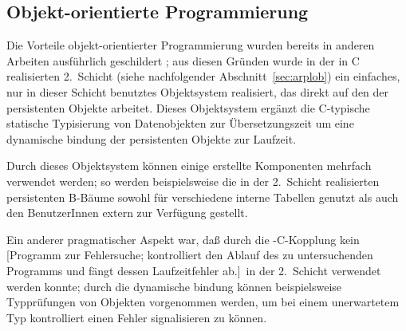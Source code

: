 \subsection{Objekt-orientierte Programmierung}%
\label{sec:ploopr}%
%
Die Vorteile objekt-orientierter Programmierung wurden bereits in
anderen Arbeiten ausf\"{u}hrlich geschildert \cite{bib:go89}; aus
diesen Gr\"{u}nden wurde in der in C realisierten 2.~Schicht (siehe
nachfolgender Abschnitt~\ref{sec:arplob}) ein einfaches, nur in dieser
Schicht benutztes Objektsystem realisiert, das direkt auf den
\representations{} der persistenten Objekte arbeitet. Dieses
Objektsystem erg\"{a}nzt die C-typische statische Typisierung von
Datenobjekten zur \"{U}bersetzungszeit um eine dynamische \cls[n]bindung
der persistenten Objekte zur Laufzeit.
%
\par{}Durch dieses Objektsystem k\"{o}n\-nen einige erstellte Komponenten
mehrfach verwendet werden; so werden beispielsweise die in der
2.~Schicht realisierten persistenten B-B\"{a}ume sowohl f\"{u}r
verschiedene interne Tabellen genutzt als auch den BenutzerInnen
extern zur Verf\"{u}gung gestellt.
%
\par{}Ein anderer pragmatischer Aspekt war, da\ss{} durch die
\cl-C-Kopplung kein [Programm zur Fehlersuche; kontrolliert den
Ablauf des zu untersuchenden Programms und f\"{a}ngt dessen
Laufzeitfehler ab.]\ in der 2.~Schicht verwendet werden konnte; durch
die dynamische \cls[n]bindung k\"{o}n\-nen beispielsweise Typpr\"{u}fungen von
Objekten vorgenommen werden, um bei einem unerwartetem Typ
kontrolliert einen Fehler signalisieren zu k\"{o}n\-nen.
%
%
%
